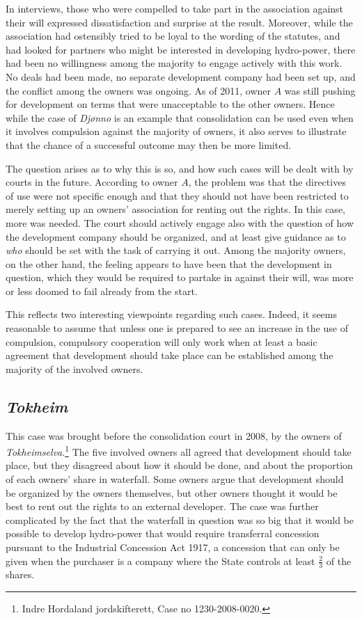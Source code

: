In interviews, those who were compelled to take part in the association against their will expressed dissatisfaction and surprise at the result. Moreover, while the association had ostensibly tried to be loyal to the wording of the statutes, and had looked for partners who might be interested in developing hydro-power, there had been no willingness among the majority to engage actively with this work. No deals had been made, no separate development company had been set up, and the conflict among the owners was ongoing. As of 2011, owner $A$ was still pushing for development on terms that were unacceptable to the other owners. Hence while the case of \emph{Djønno} is an example that consolidation can be used even when it involves compulsion against the majority of owners, it also serves to illustrate that the chance of a successful outcome may then be more limited.

The question arises as to why this is so, and how such cases will be dealt with by courts in the future. According to owner $A$, the problem was that the directives of use were not specific enough and that they should not have been restricted to merely setting up an owners' association for renting out the rights. In this case, more was needed. The court should actively engage also with the question of how the development company should be organized, and at least give guidance as to \emph{who} should be set with the task of carrying it out. Among the majority owners, on the other hand, the feeling appears to have been that the development in question, which they would be required to partake in against their will, was more or less doomed to fail already from the start.

This reflects two interesting viewpoints regarding such cases. Indeed, it seems reasonable to assume that unless one is prepared to see an increase in the use of compulsion, compulsory cooperation will only work when at least a basic agreement that development should take place can be established among the majority of the involved owners.

\subsection{\emph{Tokheim}}

This case was brought before the consolidation court in 2008, by the owners of \emph{Tokheimselva}.\footnote{Indre Hordaland jordskifterett, Case no 1230-2008-0020.} The five involved owners all agreed that development should take place, but they disagreed about how it should be done, and about the proportion of each owners' share in waterfall. Some owners argue that development should be organized by the owners themselves, but other owners thought it would be best to rent out the rights to an external developer. The case was further complicated by the fact that the waterfall in question was so big that it would be possible to develop hydro-power that would require transferral concession pursuant to the Industrial Concession Act 1917, a concession that can only be given when the purchaser is a company where the State controls at least $\frac{2}{3}$ of the shares. 

